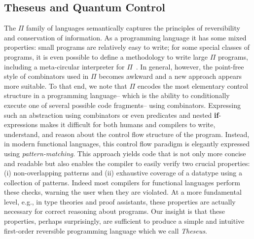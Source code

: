 \documentclass{article}
\begin{document}
\subsection{Theseus and Quantum Control}

The $\Pi$ family of languages semantically captures the principles of
reversibility and conservation of information. As a programming
language it has some mixed properties: small programs are relatively
easy to write; for some special classes of programs, it is even
possible to define a methodology to write large $\Pi$ programs,
including a meta-circular interpreter for $\Pi$~\cite{isoint}. In
general, however, the point-free style of combinators used in $\Pi$
becomes awkward and a new approach appears more suitable. To that end,
we note that $\Pi$ encodes the most elementary control structure in a
programming language-- which is the ability to conditionally execute
one of several possible code fragments-- using combinators. Expressing
such an abstraction using combinators or even predicates and nested
\textbf{if}-expressions makes it difficult for both humans and
compilers to write, understand, and reason about the control flow
structure of the program. Instead, in modern functional languages,
this control flow paradigm is elegantly expressed using
\emph{pattern-matching}. This approach yields code that is not only
more concise and readable but also enables the compiler to easily
verify two crucial properties: (i) non-overlapping patterns and (ii)
exhaustive coverage of a datatype using a collection of
patterns. Indeed most compilers for functional languages perform these
checks, warning the user when they are violated. At a more fundamental
level, e.g., in type theories and proof assistants, these properties
are actually necessary for correct reasoning about programs. Our
insight is that these properties, perhaps surprisingly, are sufficient
to produce a simple and intuitive first-order reversible programming
language which we call \emph{Theseus}.
\end{document}
